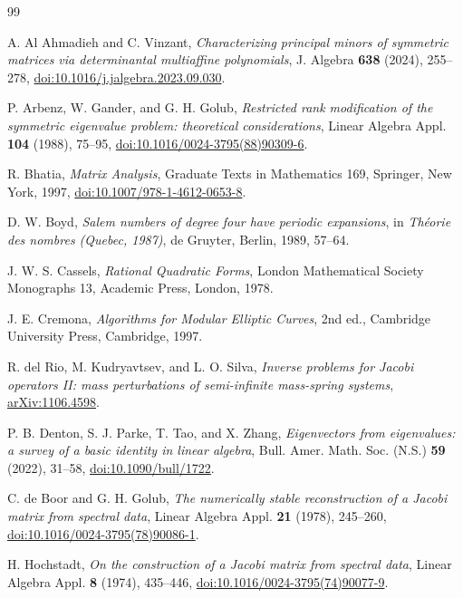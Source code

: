 \documentclass[11pt,reqno]{amsart}
\theoremstyle{definition}
\theoremstyle{remark}
\begin{document}
\begin{thebibliography}{99}

A. Al Ahmadieh and C. Vinzant,
\emph{Characterizing principal minors of symmetric matrices via
determinantal multiaffine polynomials},
J. Algebra \textbf{638} (2024), 255--278,
\href{https://doi.org/10.1016/j.jalgebra.2023.09.030}
{doi:10.1016/j.jalgebra.2023.09.030}.

P. Arbenz, W. Gander, and G. H. Golub,
\emph{Restricted rank modification of the symmetric eigenvalue problem:
theoretical considerations},
Linear Algebra Appl. \textbf{104} (1988), 75--95,
\href{https://doi.org/10.1016/0024-3795(88)90309-6}
{doi:10.1016/0024-3795(88)90309-6}.

R. Bhatia,
\emph{Matrix Analysis},
Graduate Texts in Mathematics 169, Springer, New York, 1997,
\href{https://doi.org/10.1007/978-1-4612-0653-8}
{doi:10.1007/978-1-4612-0653-8}.

D. W. Boyd,
\emph{Salem numbers of degree four have periodic expansions},
in \emph{Th\'eorie des nombres (Quebec, 1987)}, de Gruyter, Berlin, 1989,
57--64.

J. W. S. Cassels,
\emph{Rational Quadratic Forms},
London Mathematical Society Monographs 13, Academic Press, London, 1978.

J. E. Cremona,
\emph{Algorithms for Modular Elliptic Curves},
2nd ed., Cambridge University Press, Cambridge, 1997.

R. del Rio, M. Kudryavtsev, and L. O. Silva,
\emph{Inverse problems for Jacobi operators II: mass perturbations of
semi-infinite mass-spring systems},
\href{https://arxiv.org/abs/1106.4598}{arXiv:1106.4598}.

P. B. Denton, S. J. Parke, T. Tao, and X. Zhang,
\emph{Eigenvectors from eigenvalues: a survey of a basic identity in linear
algebra},
Bull. Amer. Math. Soc. (N.S.) \textbf{59} (2022), 31--58,
\href{https://doi.org/10.1090/bull/1722}{doi:10.1090/bull/1722}.

C. de Boor and G. H. Golub,
\emph{The numerically stable reconstruction of a Jacobi matrix from spectral
data},
Linear Algebra Appl. \textbf{21} (1978), 245--260,
\href{https://doi.org/10.1016/0024-3795(78)90086-1}
{doi:10.1016/0024-3795(78)90086-1}.

H. Hochstadt,
\emph{On the construction of a Jacobi matrix from spectral data},
Linear Algebra Appl. \textbf{8} (1974), 435--446,
\href{https://doi.org/10.1016/0024-3795(74)90077-9}
{doi:10.1016/0024-3795(74)90077-9}.


\end{thebibliography}
\end{document}

